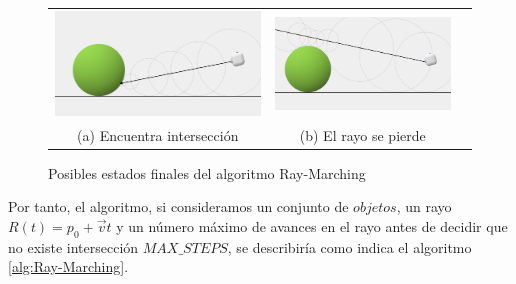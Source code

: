 \begin{figure}[ht]
    \centering
    \begin{tabular}{ccc}
      \includegraphics[scale=0.2]{img/C8/ray-marching-final.png} &     \includegraphics[scale=0.2]{img/C8/ray-marching-miss.png} \\
    (a) Encuentra intersección & (b) El rayo se pierde \\[6pt]
    \end{tabular}
    \caption{Posibles estados finales del algoritmo Ray-Marching}
    \label{fig:finales}
\end{figure}

Por tanto, el algoritmo, si consideramos un conjunto de $objetos$, un rayo $R(t)=p_0 + \vec v t$ y un número máximo de avances en el rayo antes de decidir que no existe intersección $MAX\_STEPS$, se describiría como indica el algoritmo \ref{alg:Ray-Marching}.

